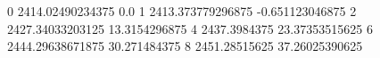 0 2414.02490234375 0.0
1 2413.373779296875 -0.651123046875
2 2427.34033203125 13.3154296875
4 2437.3984375 23.37353515625
6 2444.29638671875 30.271484375
8 2451.28515625 37.26025390625
